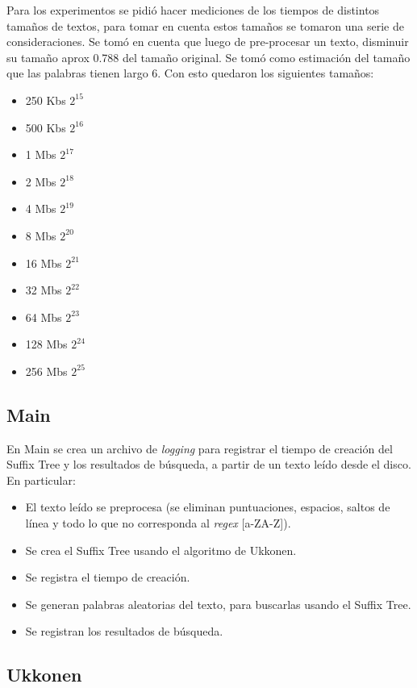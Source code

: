 \documentclass[letterpaper,10pt]{article}
\begin{document}
	Para los experimentos se pidió hacer mediciones de los tiempos de distintos tamaños de textos, para tomar en cuenta estos tamaños se tomaron una serie de consideraciones.
  Se tomó en cuenta que luego de pre-procesar un texto, disminuir su tamaño aprox 0.788 del tamaño original.
  Se tomó como estimación del tamaño que las palabras tienen largo 6.
  Con esto quedaron los siguientes tamaños:
  \begin{itemize}
     \item  250 Kbs $2^15$
     \item 500 Kbs $2^16$
     \item 1 Mbs $2^17$
     \item 2 Mbs $2^18$
     \item 4 Mbs $2^19$
     \item 8 Mbs $2^20$
     \item 16 Mbs $2^21$
     \item 32 Mbs $2^22$
     \item 64 Mbs $2^23$
     \item 128 Mbs $2^24$
     \item 256 Mbs $2^25$   
  \end{itemize}

	\subsection{Main}

	En Main se crea un archivo de \textit{logging} para registrar el tiempo de creación del Suffix Tree y los resultados de búsqueda, a partir de un texto leído desde el disco.
	En particular:
	\begin{itemize}
		\item El texto leído se preprocesa (se eliminan puntuaciones, espacios, saltos de línea y todo lo que no corresponda al \textit{regex} [a-ZA-Z]).
		\item Se crea el Suffix Tree usando el algoritmo de Ukkonen.
		\item Se registra el tiempo de creación.
		\item Se generan palabras aleatorias del texto, para buscarlas usando el Suffix Tree.
		\item Se registran los resultados de búsqueda.
	\end{itemize}

	\subsection{Ukkonen}
\end{document}
